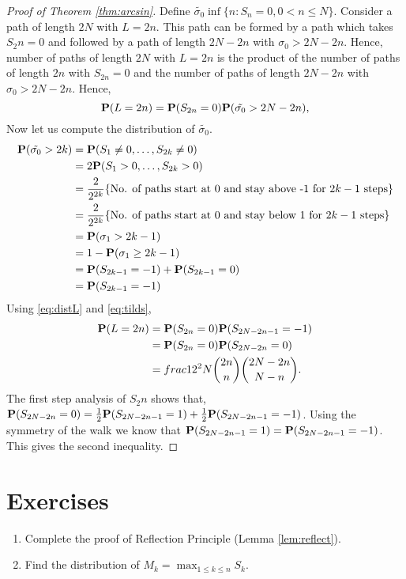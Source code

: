 \documentclass[main]{subfiles}
\begin{document}
\begin{proof}[Proof of Theorem \ref{thm:arcsin}]
    Define $\tilde{\sigma_0}\inf\{n: S_n=0, 0< n\le N\}$.
    Consider a path of length $2N$ with $L=2n$. This path can be formed by a path which takes $S_2n=0$ and followed by a path of length $2N-2n$ with $\sigma_0>2N-2n$. Hence, number of paths of length $2N$ with $L=2n$ is the product of the number of paths of length $2n$ with $S_{2n}=0$ and the number of paths of length $2N-2n$ with $\sigma_0>2N-2n$.
    Hence,
    \begin{equation}
        \P(L=2n)=\P(S_{2n}=0)\P(\tilde{\sigma_0}>2N-2n),
        \label{eq:distL}
    \end{equation}
    Now let us compute the distribution of $\tilde{\sigma_0}$.
    \begin{equation}
        \begin{aligned}
            \P(\tilde{\sigma_0}>2k) & =\P(S_1\ne 0, \ldots, S_{2k}\ne 0)                                                           \\
                                    & =2\P(S_1> 0, \ldots, S_{2k}> 0)                                                              \\
                                    & =\frac{2}{2^{2k}} \{\text{No. of paths start at 0 and stay above -1 for }2k-1\text{ steps}\} \\
                                    & =\frac{2}{2^{2k}} \{\text{No. of paths start at 0 and stay below 1 for }2k-1\text{ steps}\}  \\
                                    & =\P(\sigma_1>2k-1)                                                                           \\
                                    & =1-\P(\sigma_1\geq 2k-1)                                                                     \\
                                    & =\P(S_{2k-1}=-1)+\P(S_{2k-1}=0)                                                              \\
                                    & =\P(S_{2k-1}=-1)
        \end{aligned}
        \label{eq:tilds}
    \end{equation}
    Using \eqref{eq:distL} and \eqref{eq:tilds},
    $$
        \begin{aligned}
            \P(L=2n) & =\P(S_{2n}=0)\P(S_{2N-2n-1}=-1)                 \\
                     & =\P(S_{2n}=0)\P(S_{2N-2n}=0)                    \\
                     & = frac{1}{2^2N}\binom{2n}{n}\binom{2N-2n}{N-n}.
        \end{aligned}
    $$
    The first step analysis of $S_2n$ shows that, $\P(S_{2N-2n}=0)=\frac{1}{2}\P(S_{2N-2n-1}=1)+\frac{1}{2}\P(S_{2N-2n-1}=-1)$. Using the symmetry of the walk we know that $\P(S_{2N-2n-1}=1)=\P(S_{2N-2n-1}=-1)$. This gives the second inequality.
\end{proof}
\section{Exercises}
\begin{enumerate}
    \item Complete the proof of Reflection Principle (Lemma \ref{lem:reflect}).
    \item Find the distribution of $M_k=\max_{1\leq k\leq n} S_k$.
\end{enumerate}
\end{document}
